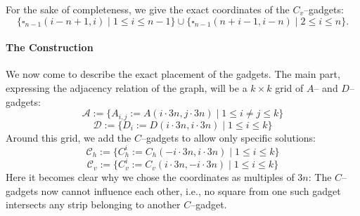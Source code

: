 \documentclass[12pt]{article}
\begin{document}
For the sake of completeness, we give the exact coordinates of the $C_v$--gadgets:
\[ \{ \square_{n-1}(i - n + 1, i) \mid 1 \leq i \leq n-1 \}
 \cup \{ \square_{n-1}(n + i - 1, i - n) \mid 2 \leq i \leq n \}. \]

\paragraph{The Construction}
We now come to describe the exact placement of the gadgets. The main part, expressing the adjacency relation of the graph, will be a $k \times k$ grid of $A$-- and $D$--gadgets:
\[ \mathcal A := \{ A_{i, j} := A(i \cdot 3n, j \cdot 3n) \mid 1 \leq  i \neq j \leq k \}\]
\[ \mathcal D := \{ D_i := D(i \cdot 3n, i \cdot 3n) \mid 1 \leq  i \leq k \}\]
Around this grid, we add the $C$--gadgets to allow only specific solutions:
\[ \mathcal C_h := \{ C_h^i := C_h(-i \cdot 3n, i \cdot 3n) \mid 1 \leq i \leq k\}\]
\[ \mathcal C_v := \{ C_v^i := C_v(i \cdot 3n, -i \cdot 3n) \mid 1 \leq i \leq k\}\]
Here it becomes clear why we chose the coordinates as multiples of $3n$: The $C$--gadgets now cannot influence each other, i.e., no square from one such gadget intersects any strip belonging to another $C$--gadget.
 
\end{document}
